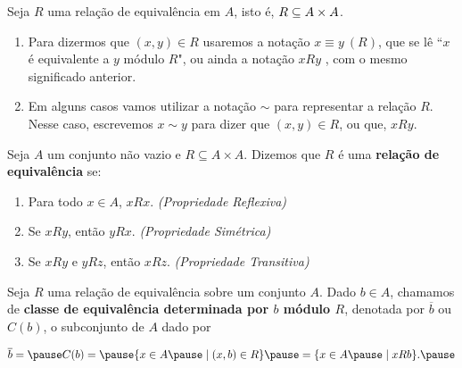 \documentclass{beamer}
\begin{document}
    \begin{frame}
        \begin{observacoes}
    Seja $R$ uma rela{\c c}{\~a}o de equival{\^e}ncia em $A$, \pause isto \'e, $R \subseteq A \times A$.\pause
    \begin{enumerate}[label={\arabic*})]
        \item  Para dizermos que $(x, y) \in R$ \pause usaremos a nota{\c c}{\~a}o $x\equiv y\ (R)$, \pause que se l{\^e} ``$x$ \'e equivalente a $y$ m{\'o}dulo $R$", \pause ou ainda a nota{\c c}{\~a}o $xRy$ \pause, com o mesmo significado anterior.\pause
        \item Em alguns casos vamos utilizar a nota\c{c}\~ao $\sim$ \pause para representar a rela\c{c}\~ao $R$. \pause Nesse caso, escrevemos $x \sim y$ \pause para dizer que $(x, y) \in R$, \pause ou que, $xRy$.\pause
    \end{enumerate}
\end{observacoes}

\begin{definicao}
    Seja $A$ um conjunto n{\~a}o vazio \pause e $R\subseteq A \times A$. \pause Dizemos que $R$ {\'e} uma \textbf{rela{\c c}{\~a}o de equival{\^e}ncia} se:\pause
    \begin{enumerate}[label={\roman*})]
        \item Para todo $x \in A$, $xRx$. \textit{(Propriedade Reflexiva)}\pause
        \item Se $xRy$, ent\~ao $yRx$. \textit{(Propriedade Sim\'etrica)}\pause
        \item Se $xRy$ e $yRz$, ent\~ao $xRz$. \textit{(Propriedade Transitiva)}\pause
    \end{enumerate}
\end{definicao}
\end{frame}
\begin{frame}
\begin{definicao}
    Seja $R$ uma rela{\c c}{\~a}o de equival{\^e}ncia sobre um conjunto $A$. \pause Dado $b \in A$, \pause chamamos de \textbf{classe de equival{\^e}ncia \pause determinada por $b$ \pause m{\'o}dulo $R$}\pause, denotada por $\overline{b}$ \pause ou $C(b)$, \pause o subconjunto de $A$ \pause dado por\pause
    \begin{center}
        $\overline{b} =\pause C(b) = \pause \{x \in A \pause \mid (x,b) \in R\}\pause = \{x \in A \pause\mid xRb\}.\pause$
    \end{center}
\end{definicao}
    \end{frame}
\end{document}
